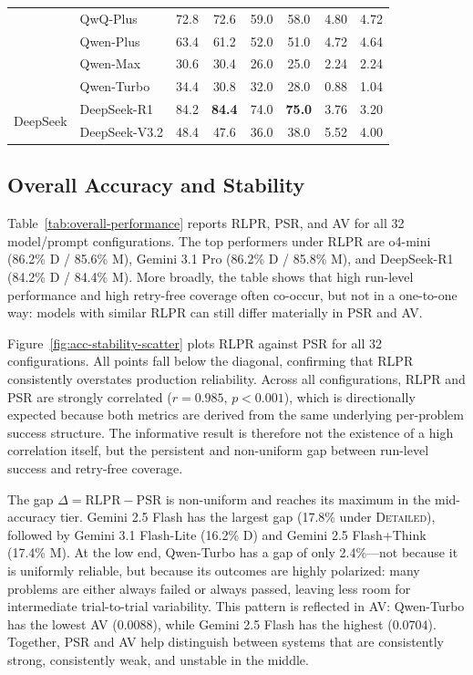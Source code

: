\documentclass[11pt]{article}
\begin{document}
\begin{table}[t]
{\begin{tabular}{llcccccc}
  & QwQ-Plus   & 72.8 & 72.6 & 59.0 & 58.0 & 4.80 & 4.72 \\
  & Qwen-Plus  & 63.4 & 61.2 & 52.0 & 51.0 & 4.72 & 4.64 \\
  & Qwen-Max   & 30.6 & 30.4 & 26.0 & 25.0 & 2.24 & 2.24 \\
  & Qwen-Turbo & 34.4 & 30.8 & 32.0 & 28.0 & 0.88 & 1.04 \\
\midrule
\multirow{2}{*}{DeepSeek}
  & DeepSeek-R1   & 84.2 & \textbf{84.4} & 74.0 & \textbf{75.0} & 3.76 & 3.20 \\
  & DeepSeek-V3.2 & 48.4 & 47.6 & 36.0 & 38.0 & 5.52 & 4.00 \\
\bottomrule
\end{tabular}
}
\end{table}

\subsection{Overall Accuracy and Stability}
Table~\ref{tab:overall-performance} reports RLPR, PSR, and AV for all 32 model/prompt configurations. The top performers under RLPR are o4-mini (86.2\% D / 85.6\% M), Gemini 3.1 Pro (86.2\% D / 85.8\% M), and DeepSeek-R1 (84.2\% D / 84.4\% M). More broadly, the table shows that high run-level performance and high retry-free coverage often co-occur, but not in a one-to-one way: models with similar RLPR can still differ materially in PSR and AV.

Figure~\ref{fig:acc-stability-scatter} plots RLPR against PSR for all 32 configurations. All points fall below the diagonal, confirming that RLPR consistently overstates production reliability. Across all configurations, RLPR and PSR are strongly correlated ($r=0.985$, $p<0.001$), which is directionally expected because both metrics are derived from the same underlying per-problem success structure. The informative result is therefore not the existence of a high correlation itself, but the persistent and non-uniform gap between run-level success and retry-free coverage.

The gap $\Delta = \mathrm{RLPR} - \mathrm{PSR}$ is non-uniform and reaches its maximum in the mid-accuracy tier. Gemini 2.5 Flash has the largest gap (17.8\% under \textsc{Detailed}), followed by Gemini 3.1 Flash-Lite (16.2\% D) and Gemini 2.5 Flash+Think (17.4\% M). At the low end, Qwen-Turbo has a gap of only 2.4\%---not because it is uniformly reliable, but because its outcomes are highly polarized: many problems are either always failed or always passed, leaving less room for intermediate trial-to-trial variability. This pattern is reflected in AV: Qwen-Turbo has the lowest AV ($0.0088$), while Gemini 2.5 Flash has the highest ($0.0704$). Together, PSR and AV help distinguish between systems that are consistently strong, consistently weak, and unstable in the middle.
\end{document}
